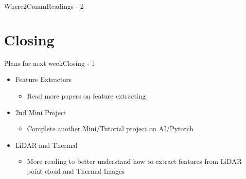 \documentclass{beamer}
\begin{document}
\begin{frame}{Where2Comm}{Readings - 2}
\end{frame}

\section{Closing}
\begin{frame}{Plans for next week}{Closing - 1}
\begin{itemize}
	\item Feature Extractors
	\begin{itemize}
		\item Read more papers on feature extracting
	\end{itemize}
	\item 2nd Mini Project
	\begin{itemize}
		\item Complete another Mini/Tutorial project on AI/Pytorch
	\end{itemize}
	\item LiDAR and Thermal
	\begin{itemize}
		\item More reading to better understand how to extract features from LiDAR point cloud and Thermal Images
	\end{itemize}
\end{itemize}
\end{frame}
\end{document}
